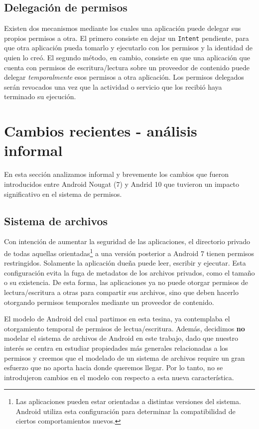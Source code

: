 \subsection*{Delegación de permisos}
Existen dos mecanismos mediante los cuales una aplicación puede delegar sus propios permisos a otra. El
primero consiste en dejar un \texttt{Intent} pendiente, para que otra aplicación pueda tomarlo y
ejecutarlo con los permisos y la identidad de quien lo creó. El segundo método, en cambio, consiste en
que una aplicación que cuenta con permisos de escritura/lectura sobre un proveedor de contenido puede
delegar \textit{temporalmente} esos permisos a otra aplicación. Los permisos delegados serán revocados
una vez que la actividad o servicio que los recibió haya terminado su ejecución.

\section{Cambios recientes - análisis informal}
\label{section:recent-changes}
En esta sección analizamos informal y brevemente los cambios que fueron introducidos entre Android Nougat
(7) y Andrid 10 que tuvieron un impacto significativo en el sistema de permisos.

\subsection{Sistema de archivos}
\label{subsection:recent-changes:filesystem}
Con intención de aumentar la seguridad de las aplicaciones, el directorio privado de todas aquellas
orientadas\footnote{
    
    Las aplicaciones pueden estar orientadas a distintas versiones del sistema. Android utiliza esta
    configuración para determinar la compatibilidad de ciertos comportamientos nuevos.

} a una versión posterior a Android 7 tienen permisos restringidos. Solamente la aplicación dueña puede
leer, escribir y ejecutar. Esta configuración evita la fuga de metadatos de los archivos privados, como
el tamaño o su existencia. De esta forma, las aplicaciones ya no puede otorgar permisos de
lectura/escritura a otras para compartir sus archivos, sino que deben hacerlo otorgando permisos
temporales mediante un proveedor de contenido.

El modelo de Android del cual partimos en esta tesina, ya contemplaba el otorgamiento temporal de
permisos de lectua/escritura. Además, decidimos \textbf{no} modelar el sistema de archivos de Android en
este trabajo, dado que nuestro interés se centra en estudiar propiedades más generales relacionadas a los
permisos y creemos que el modelado de un sistema de archivos require un gran esfuerzo que no aporta hacia
donde queremos llegar. Por lo tanto, no se introdujeron cambios en el modelo con respecto a esta nueva
característica.

